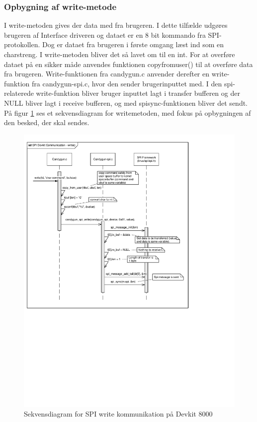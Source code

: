 \subsubsection{Opbygning af write-metode}
I write-metoden gives der data med fra brugeren. I dette tilfælde udgøres brugeren af Interface driveren og dataet er en 8 bit kommando fra SPI-protokollen. Dog er dataet fra brugeren i første omgang læst ind som en charstreng. I write-metoden bliver det så lavet om til en int.  For at overføre dataet på en sikker måde anvendes funktionen copy\textunderscore from\textunderscore user() til at overføre data fra brugeren. Write-funktionen fra candygun.c anvender derefter en write-funktion fra candygun-spi.c, hvor den sender brugerinputtet med. I den spi-relaterede write-funktion bliver bruger inputtet lagt i transfer bufferen og der NULL bliver lagt i receive bufferen, og med spi\textunderscore sync-funktionen bliver det sendt. På figur \ref{fig:spiwrite} ses et sekvensdiagram for writemetoden, med fokus på opbygningen af den besked, der skal sendes.\\

 \begin{figure}[H]
 	\centering 
 	\includegraphics[width=1.25\textwidth, trim = {0 10cm 0 0}]{Afsnit/DesignOgImplementering/images/SPIsekvenscom}
 	\caption{Sekvensdiagram for SPI write kommunikation på Devkit 8000}
 	\label{fig:spiwrite}
 \end{figure}

